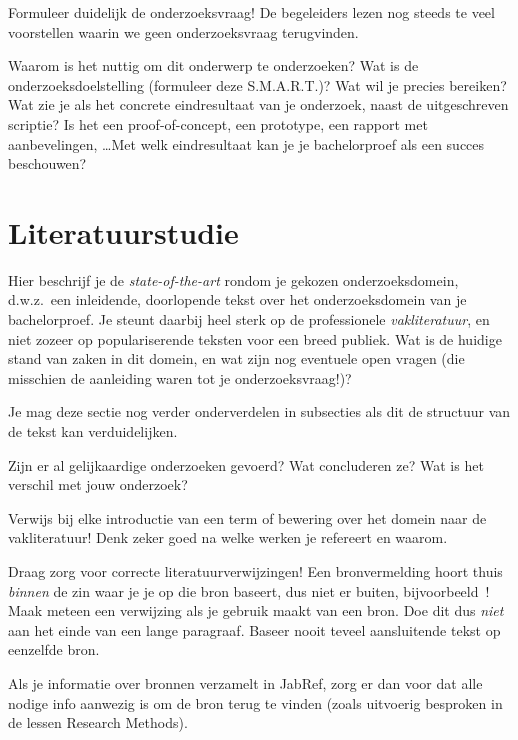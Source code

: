 \documentclass{hogent-article}
\begin{document}
Formuleer duidelijk de onderzoeksvraag! De begeleiders lezen nog steeds te veel voorstellen waarin we geen onderzoeksvraag terugvinden.

Waarom is het nuttig om dit onderwerp te onderzoeken? Wat is de onderzoeksdoelstelling (formuleer deze S.M.A.R.T.)? Wat wil je precies bereiken? Wat zie je als het concrete eindresultaat van je onderzoek, naast de uitgeschreven scriptie? Is het een proof-of-concept, een prototype, een rapport met aanbevelingen, \ldots Met welk eindresultaat kan je je bachelorproef als een succes beschouwen?

\section{Literatuurstudie}%
\label{sec:literatuurstudie}


Hier beschrijf je de \emph{state-of-the-art} rondom je gekozen onderzoeksdomein, d.w.z.\ een inleidende, doorlopende tekst over het onderzoeksdomein van je bachelorproef. Je steunt daarbij heel sterk op de professionele \emph{vakliteratuur}, en niet zozeer op populariserende teksten voor een breed publiek. Wat is de huidige stand van zaken in dit domein, en wat zijn nog eventuele open vragen (die misschien de aanleiding waren tot je onderzoeksvraag!)? 

Je mag deze sectie nog verder onderverdelen in subsecties als dit de structuur van de tekst kan verduidelijken.

Zijn er al gelijkaardige onderzoeken gevoerd? Wat concluderen ze? Wat is het verschil met jouw onderzoek?

Verwijs bij elke introductie van een term of bewering over het domein naar de vakliteratuur! Denk zeker goed na welke werken je refereert en waarom.

Draag zorg voor correcte literatuurverwijzingen! Een bronvermelding hoort thuis \emph{binnen} de zin waar je je op die bron baseert, dus niet er buiten, bijvoorbeeld~\autocite{Hykes2013}! Maak meteen een verwijzing als je gebruik maakt van een bron. Doe dit dus \emph{niet} aan het einde van een lange paragraaf. Baseer nooit teveel aansluitende tekst op eenzelfde bron.

Als je informatie over bronnen verzamelt in JabRef, zorg er dan voor dat alle nodige info aanwezig is om de bron terug te vinden (zoals uitvoerig besproken in de lessen Research Methods).

\end{document}
